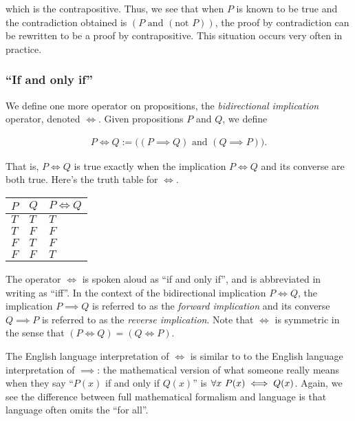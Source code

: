 which is the contrapositive. Thus, we see that when $P$ is known to be true and the contradiction obtained is $(P \text{ and } (\text{not } P))$, the proof by contradiction can be rewritten to be a proof by contrapositive. This situation occurs very often in practice.

\subsubsection*{``If and only if''}

We define one more operator on propositions, the \textit{bidirectional implication} operator, denoted $\iff$. Given propositions $P$ and $Q$, we define

\begin{align*}
    P \iff Q := \Big( (P \implies Q) \text{ and } (Q \implies P) \Big).
\end{align*}

That is, $P \iff Q$ is true exactly when the implication $P \iff Q$ and its converse are both true. Here's the truth table for $\iff$.

\begin{table}[H]
    \centering
    \begin{tabular}{|l|l|l|}
    \hline
    $P$ & $Q$ & $P \iff Q$ \\ \hline
    $T$ & $T$ & $T$        \\ \hline
    $T$ & $F$ & $F$        \\ \hline
    $F$ & $T$ & $F$        \\ \hline
    $F$ & $F$ & $T$        \\ \hline
    \end{tabular}
\end{table}

The operator $\iff$ is spoken aloud as ``if and only if'', and is abbreviated in writing as ``iff''. In the context of the bidirectional implication $P \iff Q$, the implication $P \implies Q$ is referred to as the \textit{forward implication} and its converse $Q \implies P$ is referred to as the \textit{reverse implication}. Note that $\iff$ is symmetric in the sense that $(P \iff Q) = (Q \iff P)$.

The English language interpretation of $\iff$ is similar to to the English language interpretation of $\implies$: the mathematical version of what someone really means when they say ``$P(x)$ if and only if $Q(x)$'' is $\forall x \text{ } P(x) \iff Q(x)$. Again, we see the difference between full mathematical formalism and language is that language often omits the ``for all''.

